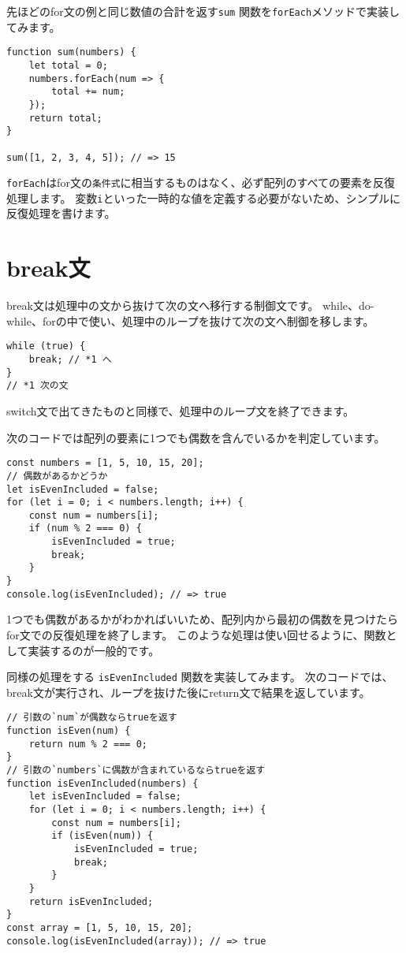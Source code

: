 先ほどのfor文の例と同じ数値の合計を返す\texttt{sum}
関数を\texttt{forEach}メソッドで実装してみます。

\begin{lstlisting}
function sum(numbers) {
    let total = 0;
    numbers.forEach(num => {
        total += num;
    });
    return total;
}

sum([1, 2, 3, 4, 5]); // => 15
\end{lstlisting}

\texttt{forEach}はfor文の\texttt{条件式}に相当するものはなく、必ず配列のすべての要素を反復処理します。
変数\texttt{i}といった一時的な値を定義する必要がないため、シンプルに反復処理を書けます。

\hypertarget{break-statement}{%
\section{break文}\label{break-statement}}

break文は処理中の文から抜けて次の文へ移行する制御文です。
while、do-while、forの中で使い、処理中のループを抜けて次の文へ制御を移します。

\begin{lstlisting}
while (true) {
    break; // *1 へ
}
// *1 次の文
\end{lstlisting}

switch文で出てきたものと同様で、処理中のループ文を終了できます。

次のコードでは配列の要素に1つでも偶数を含んでいるかを判定しています。

\begin{lstlisting}
const numbers = [1, 5, 10, 15, 20];
// 偶数があるかどうか
let isEvenIncluded = false;
for (let i = 0; i < numbers.length; i++) {
    const num = numbers[i];
    if (num % 2 === 0) {
        isEvenIncluded = true;
        break;
    }
}
console.log(isEvenIncluded); // => true
\end{lstlisting}

1つでも偶数があるかがわかればいいため、配列内から最初の偶数を見つけたらfor文での反復処理を終了します。
このような処理は使い回せるように、関数として実装するのが一般的です。

同様の処理をする \texttt{isEvenIncluded}
関数を実装してみます。
次のコードでは、break文が実行され、ループを抜けた後にreturn文で結果を返しています。

\begin{lstlisting}
// 引数の`num`が偶数ならtrueを返す
function isEven(num) {
    return num % 2 === 0;
}
// 引数の`numbers`に偶数が含まれているならtrueを返す
function isEvenIncluded(numbers) {
    let isEvenIncluded = false;
    for (let i = 0; i < numbers.length; i++) {
        const num = numbers[i];
        if (isEven(num)) {
            isEvenIncluded = true;
            break;
        }
    }
    return isEvenIncluded;
}
const array = [1, 5, 10, 15, 20];
console.log(isEvenIncluded(array)); // => true
\end{lstlisting}


